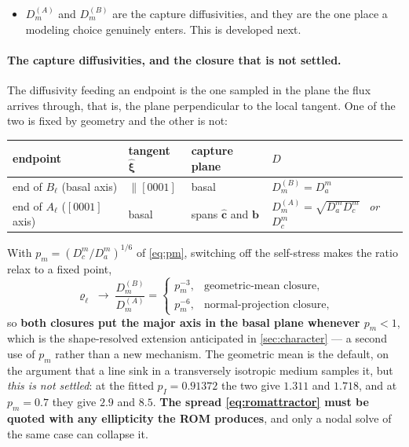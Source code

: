 \documentclass{article}
\newcommand{\bvec}{\bm b}
\begin{document}
\begin{itemize}
\begin{equation}
          \kappa_A\ln\!\frac{1}{\kappa_A r_0},
        \qquad
        \kappa_A=\frac{B_\ell}{A_\ell^{2}},
        \qquad
        \kappa_B=\frac{A_\ell}{B_\ell^{2}},
        \label{eq:romselfstress}
      \end{equation}
      $\mu/(1-\nu)$ being the edge prelogarithmic factor already used in
      \cref{sec:loopchar} and $r_0$ the core radius, and $\sigma^{(B)}_\ell$ the
      same expression evaluated at $\kappa_B$. ($\nu$ is Poisson's ratio here;
      as a subscript it indexes nodes, as in \cref{eq:arclength}.)
\item $D^{(A)}_m$ and $D^{(B)}_m$ are the capture diffusivities, and they are the
      one place a modeling choice genuinely enters. This is developed next.
\end{itemize}

\paragraph{The capture diffusivities, and the closure that is not settled.} The
diffusivity feeding an endpoint is the one sampled in the plane the flux arrives
through, that is, the plane perpendicular to the local tangent. One of the two is
fixed by geometry and the other is not:
\begin{center}\small
\begin{tabular}{@{}llll@{}}
\toprule
endpoint & tangent $\hat{\bm\xi}$ & capture plane & $D$\\
\midrule
end of $B_\ell$ (basal axis) & $\parallel[0001]$ & basal & $D^{(B)}_m=D^m_a$\\
end of $A_\ell$ ($[0001]$ axis) & basal & spans $\hat{\bm c}$ and $\bvec$ &
  $D^{(A)}_m=\sqrt{D^m_aD^m_c}$ \ \emph{or} \ $D^m_c$\\
\bottomrule
\end{tabular}
\end{center}
With $p_m=(D^m_c/D^m_a)^{1/6}$ of \cref{eq:pm}, switching off the self-stress
makes the ratio relax to a fixed point,
\begin{equation}
  \varrho_\ell\;\longrightarrow\;\frac{D^{(B)}_m}{D^{(A)}_m}
  =\begin{cases}
     p_m^{-3}, & \text{geometric-mean closure},\\[2pt]
     p_m^{-6}, & \text{normal-projection closure},
   \end{cases}
  \label{eq:romattractor}
\end{equation}
so \textbf{both closures put the major axis in the basal plane whenever
$p_m<1$}, which is the shape-resolved extension anticipated in
\cref{sec:character} --- a second use of $p_m$ rather than a new mechanism. The
geometric mean is the default, on the argument that a line sink in a transversely
isotropic medium samples it, but \emph{this is not settled}: at the fitted
$p_I=0.91372$ the two give $1.311$ and $1.718$, and at $p_m=0.7$ they give $2.9$
and $8.5$. \textbf{The spread \cref{eq:romattractor} must be quoted with any
ellipticity the ROM produces}, and only a nodal solve of the same case can
collapse it.
\end{document}
